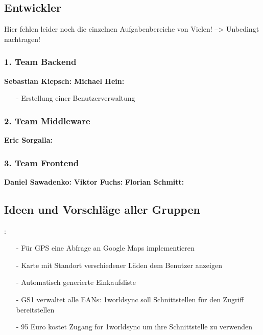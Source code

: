 \documentclass[12pt,a4paper]{article}
\begin{document}
\subsection{Entwickler}
 Hier fehlen leider noch die einzelnen Aufgabenbereiche von Vielen! --> Unbedingt nachtragen!
 
\subsubsection*{1. Team Backend}
\textbf{Sebastian Kiepsch:}
\textbf{Michael Hein:}
\begin{itemize}
\item[-]Erstellung einer Benutzerverwaltung
\end{itemize}

\subsubsection*{2. Team Middleware}
\textbf{Eric Sorgalla:}


\subsubsection*{3. Team Frontend}
\textbf{Daniel Sawadenko:}
\textbf{Viktor Fuchs:}
\newline 
\textbf{Florian Schmitt:}


\subsection{Ideen und Vorschläge aller Gruppen}:
\begin{itemize}
\item[-] Für GPS eine Abfrage an Google Maps implementieren
\item[-] Karte mit Standort verschiedener Läden dem Benutzer anzeigen
\item[-] Automatisch generierte Einkaufsliste
\item[-] GS1 verwaltet alle EANs: 1worldsync soll Schnittstellen für den Zugriff bereitstellen
\item[-] 95 Euro kostet Zugang for 1worldsync um ihre Schnittstelle zu verwenden
\end{itemize}

\newpage
\end{document}
